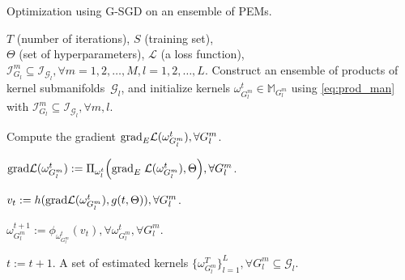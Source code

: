 \documentclass[10pt,journal,compsoc]{IEEEtran}
\newcommand{\gr}{{\rm grad}}
\theoremstyle{definition}
\theoremstyle{definition}
\theoremstyle{remark}
\theoremstyle{remark}
\theoremstyle{remark}
\begin{document}
\begin{algorithm}[tb]
	\caption{Optimization using G-SGD on an ensemble of PEMs.}
	\begin{algorithmic}[1]
		 $T$ (number of iterations), $S$ (training set), \\ $\Theta$ (set of hyperparameters), $\mathcal{L}$ (a loss function), ${\mathcal{I}^m_{{G}_l} \subseteq \mathcal{I}_{\mathcal{G}_l}}, \forall m=1,2,\ldots,M, l=1,2,\ldots,L$.
		 Construct an ensemble of products of kernel submanifolds~$ \mathcal{G}_l$, and initialize kernels
		${ \omega_{G^m_l}^t \in \mathbb{M}_{G^m_l} }$ using \eqref{eq:prod_man} with ${\mathcal{I}^m_{{G}_l} \subseteq \mathcal{I}_{\mathcal{G}_l}}, \forall m,l$.
		
		\STATE Compute the gradient $\gr_E \mathcal{L}(\omega_{G^m_l}^{t}),\forall {G^m_l}$.
		
		
		\STATE ${
		\gr \mathcal{L}(\omega_{G^m_l}^{t}) := {\rm \Pi}_{\omega_l^t}  \Big ( \gr_E \; \mathcal{L}(\omega_{G^m_l}^{t}),\Theta \Big)},\forall {G^m_l}$.
		
		
		
		
		\STATE $ v_t := h(\gr \mathcal{L}(\omega_{G^m_l}^{t}), g(t,\Theta)), \forall {G^m_l}$.
		
		\STATE $
		\omega_{G^m_l}^{t+1} := \phi_{\omega_{G^m_l}^t}(  v_t), \forall \omega_{G^m_l}^t, \forall {G^m_l}$.
		
		
		\STATE $ t := t+1$.
		\ENDFOR
		\ENDFOR
		 A set of estimated kernels $\{\omega_{G^m_l}^T \}_{l=1}^{{L}}, {\forall {G^m_l} \subseteq \mathcal{G}_l}$.
			\label{alg1}
			
	\end{algorithmic}	
	
\end{algorithm}
\end{document}
